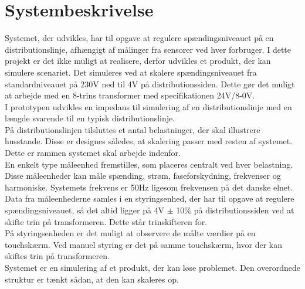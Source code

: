 
\section{Systembeskrivelse}

Systemet, der udvikles, har til opgave at regulere spændingsniveauet på en distributionslinje, afhængigt af målinger fra sensorer ved hver forbruger.
I dette projekt er det ikke muligt at realisere, derfor udvikles et produkt, der kan simulere scenariet. Det simuleres ved at skalere spændingsniveauet fra standardniveauet på 230V ned til 4V på distributionssiden. Dette gør det muligt at arbejde med en 8-trins transformer med specifikationen 24V/8-0V.\\
I prototypen udvikles en impedans til simulering af en distributionslinje med en længde svarende til en typisk distributionslinje.\\
På distributionslinjen tilsluttes et antal belastninger, der skal illustrere husstande. Disse er designes således, at skalering passer med resten af systemet. Dette er rammen systemet skal arbejde indenfor. \\
En enkelt type måleenhed fremstilles, som placeres centralt ved hver belastning. Disse måleenheder kan måle spænding, strøm, faseforskydning, frekvenser og harmoniske.  Systemets frekvens er 50Hz ligesom frekvensen på det danske elnet.\\
Data fra måleenhederne samles i en styringsenhed, der har til opgave at regulere spændingsniveauet, så det altid ligger på 4V $\pm$ 10$\%$ på distributionssiden ved at skifte trin på transformeren. Dette står trinskifteren for.\\
På styringsenheden er det muligt at observere de målte værdier på en touchskærm. Ved manuel styring er det på samme touchskærm, hvor der kan skiftes trin på transformeren.\\
Systemet er en simulering af et produkt, der kan løse problemet. Den overordnede struktur er tænkt sådan, at den kan skaleres op.\\

